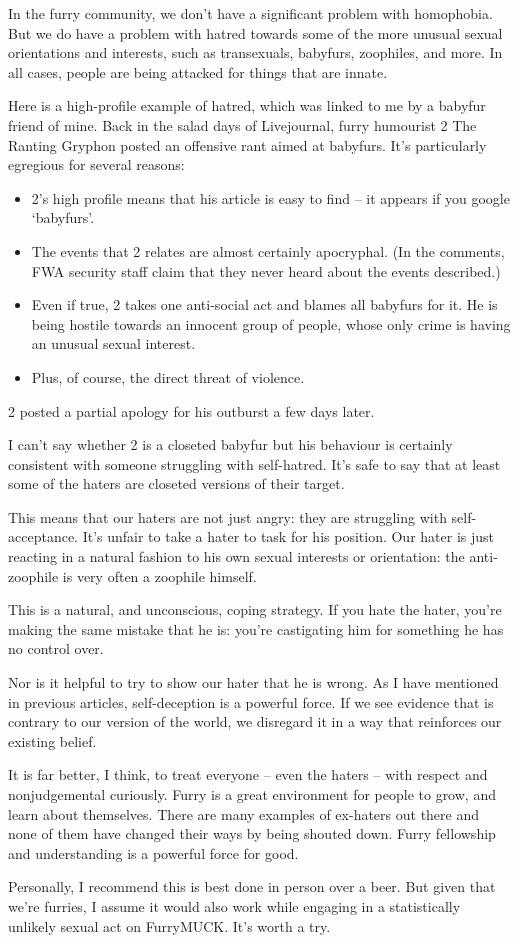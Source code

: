 In the furry community, we don't have a significant problem with homophobia. But we do have a problem with hatred towards some of the more unusual sexual orientations and interests, such as transexuals, babyfurs, zoophiles, and more. In all cases, people are being attacked for things that are innate.

Here is a high-profile example of hatred, which was linked to me by a babyfur friend of mine. Back in the salad days of Livejournal, furry humourist 2 The Ranting Gryphon posted an offensive rant aimed at babyfurs. It's particularly egregious for several reasons:

\begin{itemize}
  \item 2's high profile means that his article is easy to find -- it appears if you google ‘babyfurs'.
  \item The events that 2 relates are almost certainly apocryphal. (In the comments, FWA security staff claim that they never heard about the events described.)
  \item Even if true, 2 takes one anti-social act and blames all babyfurs for it. He is being hostile towards an innocent group of people, whose only crime is having an unusual sexual interest.
  \item Plus, of course, the direct threat of violence.
\end{itemize}

2 posted a partial apology for his outburst a few days later.

I can't say whether 2 is a closeted babyfur but his behaviour is certainly consistent with someone struggling with self-hatred. It's safe to say that at least some of the haters are closeted versions of their target.

This means that our haters are not just angry: they are struggling with self-acceptance. It's unfair to take a hater to task for his position. Our hater is just reacting in a natural fashion to his own sexual interests or orientation: the anti-zoophile is very often a zoophile himself.

This is a natural, and unconscious, coping strategy. If you hate the hater, you're making the same mistake that he is: you're castigating him for something he has no control over.

Nor is it helpful to try to show our hater that he is wrong. As I have mentioned in previous articles, self-deception is a powerful force. If we see evidence that is contrary to our version of the world, we disregard it in a way that reinforces our existing belief.

It is far better, I think, to treat everyone -- even the haters -- with respect and nonjudgemental curiously. Furry is a great environment for people to grow, and learn about themselves. There are many examples of ex-haters out there and none of them have changed their ways by being shouted down. Furry fellowship and understanding is a powerful force for good.

Personally, I recommend this is best done in person over a beer. But given that we're furries, I assume it would also work while engaging in a statistically unlikely sexual act on FurryMUCK. It's worth a try.
